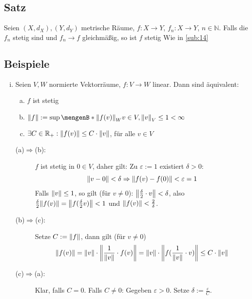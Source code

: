 \subsection[Satz über Stetigkeit des Grenzwertes einer Funktionenfolge in metrischen Räumen]{Satz} %
\label{sub:36}
Seien $(X,d_X), (Y,d_Y)$ metrische Räume, $f : X \to Y$, $f_n : X \to Y$, $n \in \mathds{N}$. Falls die $f_n$ stetig sind und $f_n \to f$ gleichmäßig, so ist $f$ stetig
Wie in \ref{sub:14} \bewende

\subsection{Beispiele} %
\label{sub:37}
\begin{enumerate}[(i)]
	\item \label{37:enum:1}
	Seien $V,W$ normierte Vektorräume, $f : V \to W$ linear. Dann sind äquivalent:
	\begin{enumerate}[a)]
		\item $f$ ist stetig
		\item $\norm{f} := \sup \set[ {\norm[W]{f(v)}} ]{v \in V, \norm[V]{v} \le 1 } < \infty $
		\item \label{37:enum:1:c}$\exists C \in \mathds{R}_+ : \norm{f(v)}\le C \cdot \norm{v} $, für alle $v \in V$
	\end{enumerate}
	\begin{description}
		\item[(a)$\Rightarrow$(b):] $f$ ist stetig in $0 \in V$, daher gilt: Zu $\varepsilon := 1$ existiert $\delta >0$:
		\[
			\norm{v-0} < \delta \Rightarrow  \norm{f(v)- f(0)} < \varepsilon = 1  
		\]
		Falls $\norm{v} \le 1 $, so gilt (für $v \not= 0$): $\norm{\frac{\delta }{2} \cdot v } < \delta$, also 
		$\frac{\delta }{2} \norm{f(v)} = \norm{f( \frac{\delta }{2} v)} < 1  $ und $\norm{f(v)}< \frac{2}{\delta}  $.
		\item[(b)$\Rightarrow$(c):] Setze $C:= \norm{f} $, dann gilt (für $v\not= 0$)
		\begin{align*}
			\norm{f(v)} =  \norm{v} \cdot  \norm{{\frac{1}{\norm{v}}} \cdot f(v)} = \norm{v} \cdot  \norm{f \enbrace{ \frac{1}{\norm{v}} \cdot v } }  \le C \cdot \norm{v} 
		\end{align*}
		\item[(c)$\Rightarrow$(a):] Klar, falls $C=0$. Falls $C \not= 0$: Gegeben $\varepsilon >0$. Setze $\delta := \frac{\varepsilon}{C} $.
		\begin{align*}

\end{align*}
\end{description}
\end{enumerate}

